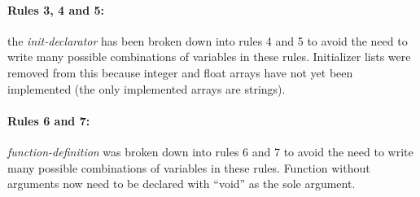 \paragraph{Rules 3, 4 and 5:} the \textit{init-declarator} has been broken down into rules 4 and 5 to avoid
the need to write many possible combinations of variables in these rules. Initializer lists were removed
from this because integer and float arrays have not yet been implemented (the only implemented arrays are strings).


\paragraph{Rules 6 and 7:} \textit{function-definition} was broken down into rules
6 and 7 to avoid the need to write many possible combinations of variables in these rules.
Function without arguments now need to be declared with ``void'' as the sole argument.


